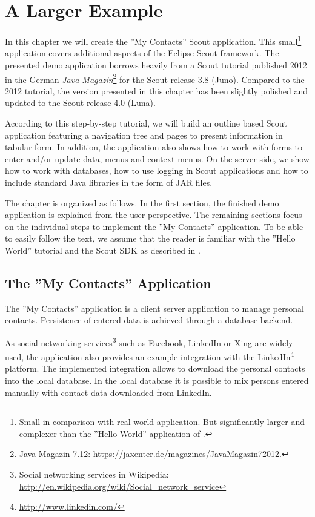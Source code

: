 \documentclass[a4paper,10pt,twoside]{book}
\begin{document}
  \sloppy
\fi

\chapter{A Larger Example}

In this chapter we will create the ''My Contacts'' Scout application.
This small\footnote{
Small in comparison with real world application. But significantly larger and complexer than the ''Hello World'' application of .
} application covers additional aspects of the Eclipse Scout framework. 
The presented demo application borrows heavily from a Scout tutorial published 2012 in the German \textit{Java Magazin}\footnote{
Java Magazin 7.12: \url{https://jaxenter.de/magazines/JavaMagazin72012}.
} 
for the Scout release 3.8 (Juno).
Compared to the 2012 tutorial, the version presented in this chapter has been slightly polished and updated to the Scout release 4.0 (Luna).

According to this step-by-step tutorial, we will build an outline based Scout application featuring a navigation tree and pages to present information in tabular form. 
In addition, the application also shows how to work with forms to enter and/or update data, menus and context menus. 
On the server side, we show how to work with databases, how to use logging in Scout applications and how to include standard Java libraries in the form of JAR files. 

The chapter is organized as follows.
In the first section, the finished demo application is explained from the user perspective. 
The remaining sections focus on the individual steps to implement the ''My Contacts'' application. 
To be able to easily follow the text, we assume that the reader is familiar with the ''Hello World'' tutorial and the Scout SDK as described in . 

\section{The ''My Contacts'' Application}

The ''My Contacts'' application is a client server application to manage personal contacts. 
Persistence of entered data is achieved through a database backend. 

As social networking services\footnote{
Social networking services in Wikipedia: \url{http://en.wikipedia.org/wiki/Social_network_service}
} 
such as Facebook, LinkedIn or Xing are widely used, the application also provides an example integration with the LinkedIn\footnote{
\url{http://www.linkedin.com/}
} 
platform. 
The implemented integration allows to download the personal contacts into the local database. 
In the local database it is possible to mix persons entered manually with contact data downloaded from LinkedIn. 
\end{document}
